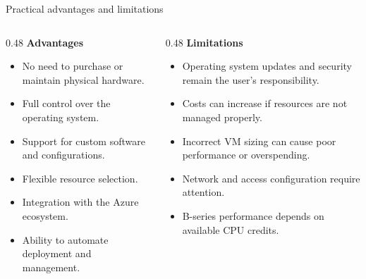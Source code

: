 \documentclass[aspectratio=169,xcolor=dvipsnames]{beamer}
\begin{document}
	\begin{frame}{Practical advantages and limitations}
		\begin{columns}[T]
			\begin{column}{0.48\textwidth}
				\textbf{\large Advantages}
				\begin{itemize}
					\item No need to purchase or maintain physical hardware.
					\item Full control over the operating system.
					\item Support for custom software and configurations.
					\item Flexible resource selection.
					\item Integration with the Azure ecosystem.
					\item Ability to automate deployment and management.
				\end{itemize}
			\end{column}
			
			\begin{column}{0.48\textwidth}
				\textbf{\large Limitations}
				\begin{itemize}
					\item Operating system updates and security remain the user's responsibility.
					\item Costs can increase if resources are not managed properly.
					\item Incorrect VM sizing can cause poor performance or overspending.
					\item Network and access configuration require attention.
					\item B-series performance depends on available CPU credits.
				\end{itemize}
			\end{column}
		\end{columns}
	\end{frame}
	
\end{document}
